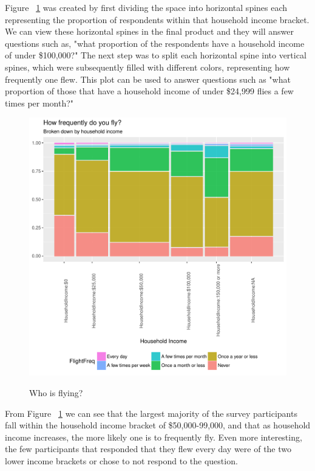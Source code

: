 \documentclass[DIV=calc, paper=a4, fontsize=10pt, twocolumn]{scrartcl}	 %
\begin{document}
\par Figure ~\ref{fig: who1} was created by first dividing the space into horizontal spines each representing the proportion of respondents within that household income bracket. We can view these horizontal spines in the final product and they will answer questions such as, "what proportion of the respondents have a household income of under \$100,000?" The next step was to split each horizontal spine into vertical spines, which were subsequently filled with different colors,  representing how frequently one flew. This plot can be used to answer questions such as "what proportion of those that have a household income of under \$24,999 flies a few times per month?"



\begin{figure}[h!]
\caption{Who is flying?}
\centering
\includegraphics{flying-who1}
\label{fig: who1}
\end{figure}

\par From Figure ~\ref{fig: who1} we can see that the largest majority of the survey participants fall within the household income bracket of \$50,000-99,000, and that as household income increases, the more likely one is to frequently fly. Even more interesting, the few participants that responded that they flew every day were of the two lower income brackets or chose to not respond to the question.
\end{document}

